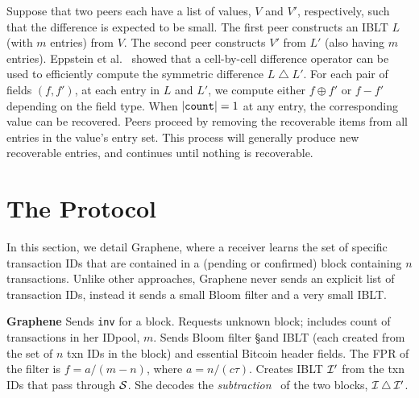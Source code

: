 Suppose that two peers each have a list of values, $V$ and $V'$,
respectively, such that the difference is expected to be small.  The
first peer constructs an IBLT $L$ (with $m$ entries) from $V$.  The
second peer constructs $V'$ from $L'$ (also having $m$ entries).
Eppstein et al.~\cite{eppstein:2011} showed that a cell-by-cell
difference operator can be used to efficiently compute the symmetric
difference $L \bigtriangleup L'$.  For each pair of fields $(f, f')$,
at each entry in $L$ and $L'$, we compute either $f \oplus f'$ or
\mbox{$f - f'$} depending on the field type.  When
$|\mbox{\texttt{count}}| = 1$ at any entry, the corresponding
value can be recovered.  
  Peers proceed by removing the recoverable items from all entries in the value's entry set.
This process will generally produce new recoverable entries, and
continues until nothing is recoverable.
 
\section{The Protocol}

In this section, we detail Graphene,
where a receiver 
learns the set of specific transaction IDs that are contained in a
(pending or confirmed) block containing $n$ transactions. Unlike other approaches, Graphene never  sends an explicit list of transaction IDs, instead it sends  a small Bloom filter and a very small IBLT.  

{\begin{myprot}{\textbf{Graphene}}
\STATE \sender Sends {\tt inv} for a block.
%
\STATE \recvr \hspace{-.1mm}Requests unknown block; includes count of transactions in her IDpool, $m$.
\STATE \sender  Sends Bloom filter \S  and IBLT \I (each created from the set of $n$ txn IDs in the block) and essential Bitcoin header fields.  The FPR of the filter is $f=a/(m-n)$, where $a=n/(c\tau)$.%
%
\STATE \recvr Creates IBLT $\cal{I}'$ from the txn IDs that pass through $\cal{S}$. She decodes the {\em subtraction}~\cite{eppstein:2011} of the two blocks, $\cal{I} \bigtriangleup \cal{I'}$.\end{myprot}}

